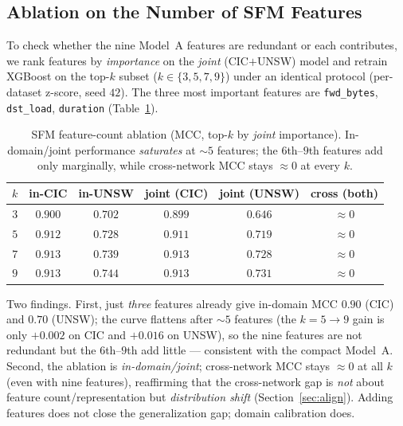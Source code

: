 \documentclass[preprint,12pt,authoryear]{elsarticle}
\begin{document}
\subsection{Ablation on the Number of SFM Features}
\label{sec:ablation}
To check whether the nine Model~A features are redundant or each contributes, we
rank features by \emph{importance} on the \emph{joint} (CIC$+$UNSW) model and
retrain XGBoost on the top-$k$ subset ($k\in\{3,5,7,9\}$) under an identical
protocol (per-dataset z-score, seed $42$). The three most important features are
\texttt{fwd\_bytes}, \texttt{dst\_load}, \texttt{duration}
(Table~\ref{tab:ablation}).

\begin{table}[htbp]
\centering
\caption{SFM feature-count ablation (MCC, top-$k$ by \emph{joint} importance).
In-domain/joint performance \emph{saturates} at $\sim$$5$ features; the $6$th--$9$th
features add only marginally, while cross-network MCC stays $\approx 0$ at every $k$.}
\label{tab:ablation}
\begin{tabular}{cccccc}
\toprule
$k$ & in-CIC & in-UNSW & joint (CIC) & joint (UNSW) & cross (both) \\
\midrule
$3$ & $0.900$ & $0.702$ & $0.899$ & $0.646$ & $\approx 0$ \\
$5$ & $0.912$ & $0.728$ & $0.911$ & $0.719$ & $\approx 0$ \\
$7$ & $0.913$ & $0.739$ & $0.913$ & $0.728$ & $\approx 0$ \\
$9$ & $0.913$ & $0.744$ & $0.913$ & $0.731$ & $\approx 0$ \\
\bottomrule
\end{tabular}
\end{table}

Two findings. First, just \emph{three} features already give in-domain MCC $0.90$
(CIC) and $0.70$ (UNSW); the curve flattens after $\sim$$5$ features (the
$k{=}5\!\to\!9$ gain is only $+0.002$ on CIC and $+0.016$ on UNSW), so the nine
features are not redundant but the $6$th--$9$th add little --- consistent with the
compact Model~A. Second, the ablation is \emph{in-domain/joint}; cross-network MCC
stays $\approx 0$ at all $k$ (even with nine features), reaffirming that the
cross-network gap is \emph{not} about feature count/representation but
\emph{distribution shift} (Section~\ref{sec:align}). Adding features does not close
the generalization gap; domain calibration does.

\FloatBarrier
\end{document}
